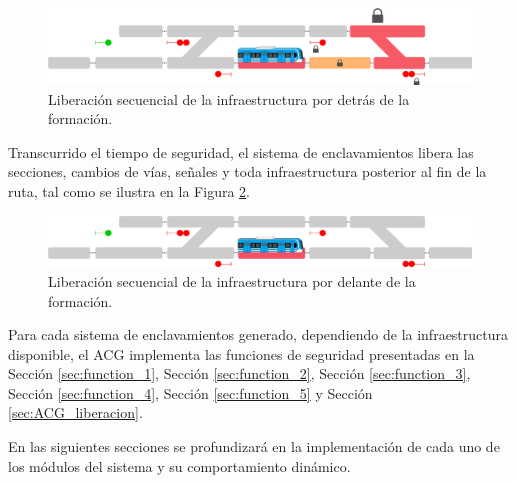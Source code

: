 	\begin{figure}[!h]
	  \centering
	  \includegraphics[width=1\textwidth]{Figuras/secuencial_3}
	  \centering\caption{Liberación secuencial de la infraestructura por detrás de la formación.}
	  \label{fig:ACG_secuencial_3}
	\end{figure}
 
 	Transcurrido el tiempo de seguridad, el sistema de enclavamientos libera las secciones, cambios de vías, señales y toda infraestructura posterior al fin de la ruta, tal como se ilustra en la Figura \ref{fig:ACG_secuencial_4}.

	 \begin{figure}[!h]
	     \centering
	     \includegraphics[width=1\textwidth]{Figuras/secuencial_4}
	     \centering\caption{Liberación secuencial de la infraestructura por delante de la formación.}
	     \label{fig:ACG_secuencial_4}
	 \end{figure}
	    
	Para cada sistema de enclavamientos generado, dependiendo de la infraestructura disponible, el ACG implementa las funciones de seguridad presentadas en la Sección \ref{sec:function_1}, Sección \ref{sec:function_2}, Sección \ref{sec:function_3}, Sección \ref{sec:function_4}, Sección \ref{sec:function_5} y Sección \ref{sec:ACG_liberacion}.
	
	En las siguientes secciones se profundizará en la implementación de cada uno de los módulos del sistema y su comportamiento dinámico.